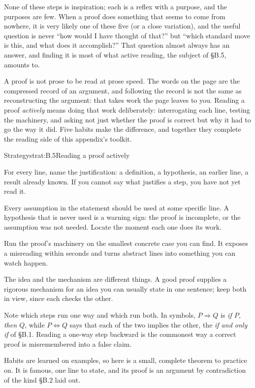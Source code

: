 \documentclass[a4paper,12pt,oneside]{memoir}
\begin{document}
None of these steps is inspiration; each is a reflex with a purpose, and the purposes are few. When a proof does something that seems to come from nowhere, it is very likely one of these five (or a close variation), and the useful question is never “how would I have thought of that?” but “which standard move is this, and what does it accomplish?” That question almost always has an answer, and finding it is most of what active reading, the subject of §B.5, amounts to.


A proof is not prose to be read at prose speed. The words on the page are the compressed record of an argument, and following the record is not the same as reconstructing the argument: that takes work the page leaves to you. Reading a proof \emph{actively} means doing that work deliberately: interrogating each line, testing the machinery, and asking not just whether the proof is correct but why it had to go the way it did. Five habits make the difference, and together they complete the reading side of this appendix’s toolkit.

\begin{envstrategy}{Strategy}{strat:B.5}{Reading a proof actively}
\begin{steps}
  \item {} For every line, name the justification: a definition, a hypothesis, an earlier line, a result already known. If you cannot say what justifies a step, you have not yet read it.
  \item {} Every assumption in the statement should be used at some specific line. A hypothesis that is never used is a warning sign: the proof is incomplete, or the assumption was not needed. Locate the moment each one does its work.
  \item {} Run the proof’s machinery on the smallest concrete case you can find. It exposes a misreading within seconds and turns abstract lines into something you can watch happen.
  \item {} The idea and the mechanism are different things. A good proof supplies a rigorous mechanism for an idea you can usually state in one sentence; keep both in view, since each checks the other.
  \item {} Note which steps run one way and which run both. In symbols, \(P \Rightarrow Q\) is \emph{if \(P\), then \(Q\)}, while \(P \Leftrightarrow Q\) says that each of the two implies the other, the \emph{if and only if} of §B.1. Reading a one-way step backward is the commonest way a correct proof is misremembered into a false claim.
\end{steps}
\end{envstrategy}
Habits are learned on examples, so here is a small, complete theorem to practice on. It is famous, one line to state, and its proof is an argument by contradiction of the kind §B.2 laid out.
\end{document}
